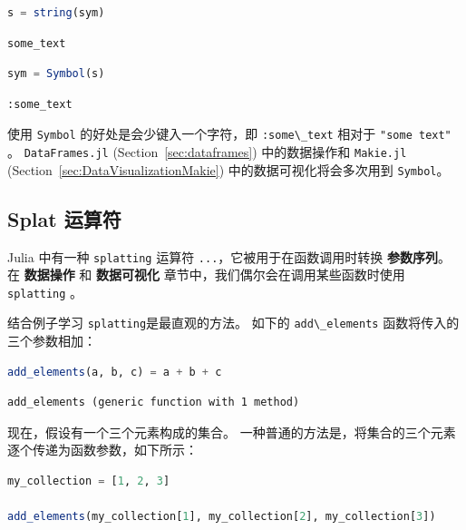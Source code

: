 \documentclass[
  notoc %
]{tufte-book}
\newcommand{\passthrough}[1]{#1}
\begin{document}
\begin{lstlisting}[language=Julia]
s = string(sym)
\end{lstlisting}

\begin{lstlisting}[language=Output]
some_text
\end{lstlisting}

\begin{lstlisting}[language=Julia]
sym = Symbol(s)
\end{lstlisting}

\begin{lstlisting}[language=Output]
:some_text
\end{lstlisting}

使用 \passthrough{\lstinline!Symbol!} 的好处是会少键入一个字符，即
\passthrough{\lstinline!:some\_text!} 相对于
\passthrough{\lstinline!"some text"!} 。
\passthrough{\lstinline!DataFrames.jl!} (Section~\ref{sec:dataframes})
中的数据操作和 \passthrough{\lstinline!Makie.jl!}
(Section~\ref{sec:DataVisualizationMakie}) 中的数据可视化将会多次用到
\passthrough{\lstinline!Symbol!}。

\hypertarget{sec:splat}{%
\subsection{Splat 运算符}\label{sec:splat}}

Julia 中有一种 \passthrough{\lstinline!splatting!} 运算符
\passthrough{\lstinline!...!}，它被用于在函数调用时转换
\textbf{参数序列}。 在 \textbf{数据操作} 和 \textbf{数据可视化}
章节中，我们偶尔会在调用某些函数时使用
\passthrough{\lstinline!splatting!} 。

结合例子学习 \passthrough{\lstinline!splatting!}是最直观的方法。 如下的
\passthrough{\lstinline!add\_elements!} 函数将传入的三个参数相加：

\begin{lstlisting}[language=Julia]
add_elements(a, b, c) = a + b + c
\end{lstlisting}

\begin{lstlisting}[language=Output]
add_elements (generic function with 1 method)
\end{lstlisting}

现在，假设有一个三个元素构成的集合。
一种普通的方法是，将集合的三个元素逐个传递为函数参数，如下所示：

\begin{lstlisting}[language=Julia]
my_collection = [1, 2, 3]

add_elements(my_collection[1], my_collection[2], my_collection[3])
\end{lstlisting}
\end{document}

